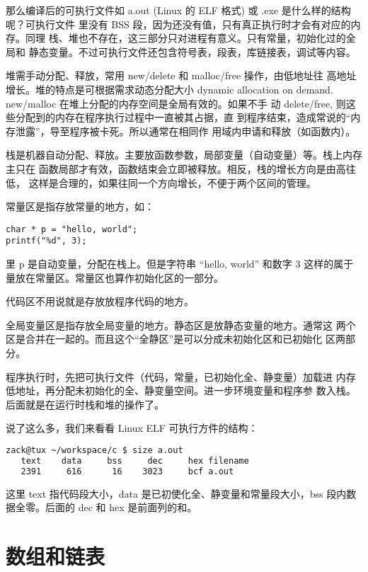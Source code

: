 那么编译后的可执行文件如 a.out (Linux 的 ELF 格式) 或 .exe 是什么样的结构呢？可执行文件
里没有 BSS 段，因为还没有值，只有真正执行时才会有对应的内存。同理
栈、堆也不存在，这三部分只对进程有意义。只有常量，初始化过的全局和
静态变量。不过可执行文件还包含符号表，段表，库链接表，调试等内容。

堆需手动分配、释放，常用 new/delete 和 malloc/free 操作，由低地址往
高地址增长。堆的特点是可根据需求动态分配大小 dynamic allocation on
demand. new/malloc 在堆上分配的内存空间是全局有效的。如果不手
动 delete/free, 则这些分配到的内存在程序执行过程中一直被其占据，直
到程序结束，造成常说的“内存泄露”，导至程序被卡死。所以通常在相同作
用域内申请和释放（如函数内）。

栈是机器自动分配、释放。主要放函数参数，局部变量（自动变量）等。栈上内存主只在
函数局部才有效，函数结束会立即被释放。相反，栈的增长方向是由高往低，
这样是合理的，如果往同一个方向增长，不便于两个区间的管理。

常量区是指存放常量的地方，如：

\begin{lstlisting}
char * p = "hello, world";
printf("%d", 3);
\end{lstlisting}

里 p 是自动变量，分配在栈上。但是字符串 ``hello, world'' 和数字 3
这样的属于量放在常量区。常量区也算作初始化区的一部分。

代码区不用说就是存放放程序代码的地方。

全局变量区是指存放全局变量的地方。静态区是放静态变量的地方。通常这
两个区是合并在一起的。而且这个“全静区”是可以分成未初始化区和已初始化
区两部分。

程序执行时，先把可执行文件（代码，常量，已初始化全、静变量）加载进
内存低地址，再分配未初始化的全、静变量空间。进一步环境变量和程序参
数入栈。后面就是在运行时栈和堆的操作了。

说了这么多，我们来看看 Linux ELF 可执行方件的结构：

\begin{lstlisting}[language=bash,caption={EFL Layout},label={lst:elf-layout}]
  zack@tux ~/workspace/c $ size a.out
   text    data     bss     dec     hex filename
   2391     616      16    3023     bcf a.out
\end{lstlisting}

这里 text 指代码段大小，data 是已初使化全、静变量和常量段大小，bss
段内数据全零。后面的 dec 和 hex 是前面列的和。

\section{数组和链表}

